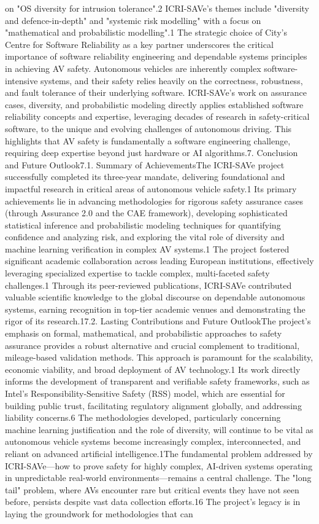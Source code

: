 on "OS diversity for intrusion tolerance".2 ICRI-SAVe's themes include "diversity and defence-in-depth" and "systemic risk modelling" with a focus on "mathematical and probabilistic modelling".1 The strategic choice of City's Centre for Software Reliability as a key partner underscores the critical importance of software reliability engineering and dependable systems principles in achieving AV safety. Autonomous vehicles are inherently complex software-intensive systems, and their safety relies heavily on the correctness, robustness, and fault tolerance of their underlying software. ICRI-SAVe's work on assurance cases, diversity, and probabilistic modeling directly applies established software reliability concepts and expertise, leveraging decades of research in safety-critical software, to the unique and evolving challenges of autonomous driving. This highlights that AV safety is fundamentally a software engineering challenge, requiring deep expertise beyond just hardware or AI algorithms.7. Conclusion and Future Outlook7.1. Summary of AchievementsThe ICRI-SAVe project successfully completed its three-year mandate, delivering foundational and impactful research in critical areas of autonomous vehicle safety.1 Its primary achievements lie in advancing methodologies for rigorous safety assurance cases (through Assurance 2.0 and the CAE framework), developing sophisticated statistical inference and probabilistic modeling techniques for quantifying confidence and analyzing risk, and exploring the vital role of diversity and machine learning verification in complex AV systems.1 The project fostered significant academic collaboration across leading European institutions, effectively leveraging specialized expertise to tackle complex, multi-faceted safety challenges.1 Through its peer-reviewed publications, ICRI-SAVe contributed valuable scientific knowledge to the global discourse on dependable autonomous systems, earning recognition in top-tier academic venues and demonstrating the rigor of its research.17.2. Lasting Contributions and Future OutlookThe project's emphasis on formal, mathematical, and probabilistic approaches to safety assurance provides a robust alternative and crucial complement to traditional, mileage-based validation methods. This approach is paramount for the scalability, economic viability, and broad deployment of AV technology.1 Its work directly informs the development of transparent and verifiable safety frameworks, such as Intel's Responsibility-Sensitive Safety (RSS) model, which are essential for building public trust, facilitating regulatory alignment globally, and addressing liability concerns.6 The methodologies developed, particularly concerning machine learning justification and the role of diversity, will continue to be vital as autonomous vehicle systems become increasingly complex, interconnected, and reliant on advanced artificial intelligence.1The fundamental problem addressed by ICRI-SAVe—how to prove safety for highly complex, AI-driven systems operating in unpredictable real-world environments—remains a central challenge. The "long tail" problem, where AVs encounter rare but critical events they have not seen before, persists despite vast data collection efforts.16 The project's legacy is in laying the groundwork for methodologies that can 